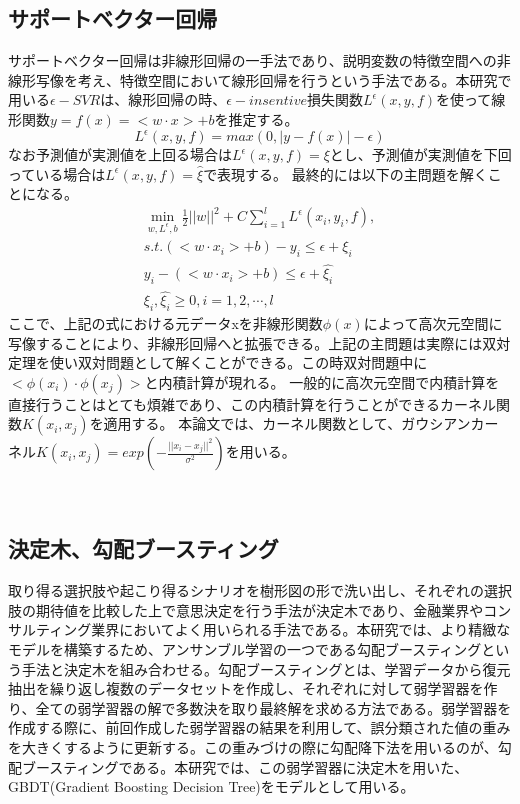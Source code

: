 \subsection{サポートベクター回帰}
サポートベクター回帰は非線形回帰の一手法であり、説明変数の特徴空間への非線形写像を考え、特徴空間において線形回帰を行うという手法である。本研究で用いる$\epsilon-SVR$は、線形回帰の時、$\epsilon-insentive$損失関数$L^{\epsilon}(x,y,f)$を使って線形関数$y=f(x)=<w\cdot x>+b$を推定する。
\begin{equation}
L^{\epsilon}(x,y,f)=max(0,|y-f(x)|-\epsilon)
\end{equation}
なお予測値が実測値を上回る場合は$L^{\epsilon}(x,y,f)=\xi$とし、予測値が実測値を下回っている場合は$L^{\epsilon}(x,y,f)=\hat{\xi}$で表現する。
最終的には以下の主問題を解くことになる。
\begin{eqnarray}
\min_{w,L^{\epsilon},b}\frac{1}{2}||w||^{2}+C\sum_{i=1}^{l}L^{\epsilon}(x_{i},y_{i},f), \\
s.t. (<w\cdot x_{i}>+b)-y_{i}\le\epsilon+\xi_{i} \\
y_{i}-(<w\cdot x_{i}>+b)\le\epsilon+\hat{\xi_{i}} \\
\xi_{i},\hat{\xi_{i}}\ge 0, i=1,2,\cdots,l
\end{eqnarray}
ここで、上記の式における元データxを非線形関数$\phi(x)$によって高次元空間に写像することにより、非線形回帰へと拡張できる。上記の主問題は実際には双対定理を使い双対問題として解くことができる。この時双対問題中に$<\phi(x_{i})\cdot\phi(x_{j})>$と内積計算が現れる。
一般的に高次元空間で内積計算を直接行うことはとても煩雑であり、この内積計算を行うことができるカーネル関数$K(x_{i},x_{j})$を適用する。
本論文では、カーネル関数として、ガウシアンカーネル$K(x_{i},x_{j})=exp(-\frac{||x_{i}-x_{j}||^{2}}{\sigma^{2}})$を用いる。

\ 
\subsection{決定木、勾配ブースティング}
取り得る選択肢や起こり得るシナリオを樹形図の形で洗い出し、それぞれの選択肢の期待値を比較した上で意思決定を行う手法が決定木であり、金融業界やコンサルティング業界においてよく用いられる手法である。本研究では、より精緻なモデルを構築するため、アンサンブル学習の一つである勾配ブースティングという手法と決定木を組み合わせる。勾配ブースティングとは、学習データから復元抽出を繰り返し複数のデータセットを作成し、それぞれに対して弱学習器を作り、全ての弱学習器の解で多数決を取り最終解を求める方法である。弱学習器を作成する際に、前回作成した弱学習器の結果を利用して、誤分類された値の重みを大きくするように更新する。この重みづけの際に勾配降下法を用いるのが、勾配ブースティングである。本研究では、この弱学習器に決定木を用いた、GBDT(Gradient Boosting Decision Tree)をモデルとして用いる。

